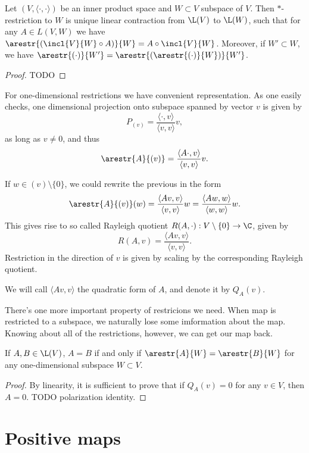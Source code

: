 \begin{lause}
	Let $(V, \langle \cdot, \cdot \rangle)$ be an inner product space and $W \subset V$ subspace of $V$. Then $*$-restriction to $W$ is unique linear contraction from $\L(V)$ to $\L(W)$, such that for any $A \in L(V, W)$ we have $\arestr{(\incl{V}{W} \circ A)}{W} = A \circ \incl{V}{W}$. Moreover, if $W' \subset W$, we have $\arestr{(\cdot)}{W'} = \arestr{(\arestr{(\cdot)}{W})}{W'}$.
\end{lause}
\begin{proof}
	TODO
\end{proof}

For one-dimensional restrictions we have convenient representation. As one easily checks, one dimensional projection onto subspace spanned by vector $v$ is given by
\[
	P_{(v)} = \frac{\langle \cdot, v \rangle}{\langle v, v \rangle} v,
\]
as long as $v \neq 0$, and thus
\[
	\arestr{A}{(v)} = \frac{\langle A \cdot, v \rangle}{\langle v, v \rangle} v.
\]

If $w \in (v) \setminus \{0\}$, we could rewrite the previous in the form
\[
	\arestr{A}{(v)}(w) = \frac{\langle A v, v\rangle}{\langle v, v\rangle} w = \frac{\langle A w, w\rangle}{\langle w, w \rangle} w.
\]
This gives rise to so called Rayleigh quotient $R(A, \cdot) : V \setminus \{0\} \to \C$, given by
\[
	R(A, v) = \frac{\langle A v, v \rangle}{\langle v, v \rangle}.
\]
Restriction in the direction of $v$ is given by scaling by the corresponding Rayleigh quotient.

We will call $\langle A v, v \rangle$ the quadratic form of $A$, and denote it by $Q_{A}(v)$.

There's one more important property of restricions we need. When map is restricted to a subspace, we naturally lose some imformation about the map. Knowing about all of the restrictions, however, we can get our map back.

\begin{lem}
	If $A, B \in \L(V)$, $A = B$ if and only if $\arestr{A}{W} = \arestr{B}{W}$ for any one-dimensional subspace $W \subset V$.
\end{lem} 
\begin{proof}
	By linearity, it is sufficient to prove that if $Q_{A}(v) = 0$ for any $v \in V$, then $A = 0$. TODO polarization identity.
\end{proof}

\section{Positive maps}

